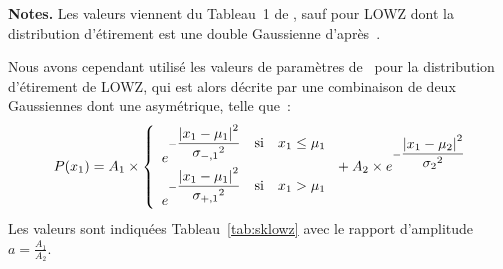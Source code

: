 \documentclass[../main/main.tex]{subfiles}
\begin{document}
\begin{table}[h]
    \centering
        \caption[Paramètres des distributions d'étirement et de couleur pour les
        simulations SK]{Paramètres des distributions sous-jacentes d'étirement
            et de couleur desquelles sont générées les SNe~Ia dans notre
        reproduction du travail de .}
        \label{tab:skasym}
    \begin{threeparttable}
        \begin{tablenotes}[flushleft]
        \item\small \textbf{\hspace{-3,2pt}Notes.} Les valeurs viennent du
            Tableau~1 de , sauf pour LOWZ dont la
            distribution d'étirement est une double Gaussienne
            d'après~\cite{scolnic2018}.
        \end{tablenotes}
    \end{threeparttable}
\end{table}

Nous avons cependant utilisé les valeurs de paramètres de~\cite{scolnic2018}
pour la distribution d'étirement de LOWZ, qui est alors décrite par une
combinaison de deux Gaussiennes dont une asymétrique, telle que~:
\begin{equation}\label{eq:sklowz}
    P(x_1) = A_1\times
        \left\{
        \begin{array}{l}
            e^{-\displaystyle\frac{\abs{x_1-\mu_1}^2}{\sigma_{-,1}{}^2}
                \quad\text{si}\quad x_1\leq\mu_1} \\
            e^{-\displaystyle\frac{\abs{x_1-\mu_1}^2}{\sigma_{+,1}{}^2}
                \quad\text{si}\quad x_1>\mu_1} \\
        \end{array}
        \right. + A_2\times
        e^{-\displaystyle\frac{\abs{x_1-\mu_2}^2}{\sigma_{2}{}^2}}
\end{equation}
Les valeurs sont indiquées Tableau~\ref{tab:sklowz} avec le rapport d'amplitude
$a=\frac{A_1}{A_2}$. 
\end{document}
